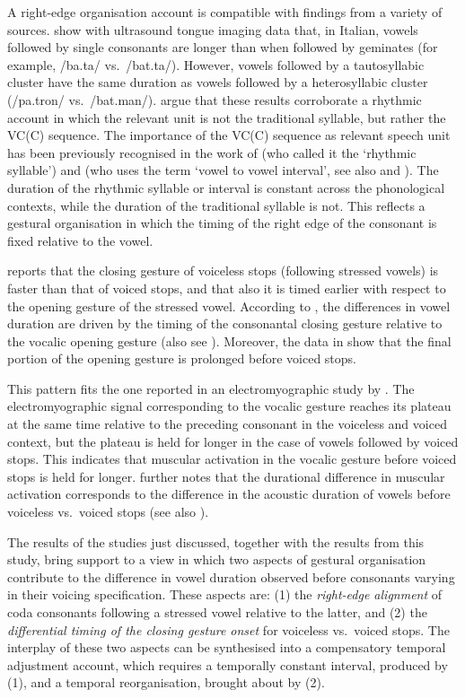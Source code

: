 \documentclass[12pt,]{article}
\begin{document}
A right-edge organisation account is compatible with findings from a
variety of sources. \citet{celata2018} show with ultrasound tongue
imaging data that, in Italian, vowels followed by single consonants are
longer than when followed by geminates (for example, /ba.ta/
vs.~/bat.ta/). However, vowels followed by a tautosyllabic cluster have
the same duration as vowels followed by a heterosyllabic cluster
(/pa.tron/ vs.~/bat.man/). \citet{celata2018} argue that these results
corroborate a rhythmic account in which the relevant unit is not the
traditional syllable, but rather the VC(C) sequence. The importance of
the VC(C) sequence as relevant speech unit has been previously
recognised in the work of \citet{farnetani1986} (who called it the
`rhythmic syllable') and \citet{steriade2012} (who uses the term `vowel
to vowel interval', see also \citealt{hirsch2014} and
\citealt{lunden2017}). The duration of the rhythmic syllable or interval
is constant across the phonological contexts, while the duration of the
traditional syllable is not. This reflects a gestural organisation in
which the timing of the right edge of the consonant is fixed relative to
the vowel.

\citet{de-jong1991} reports that the closing gesture of voiceless stops
(following stressed vowels) is faster than that of voiced stops, and
that also it is timed earlier with respect to the opening gesture of the
stressed vowel. According to \citet{de-jong1991}, the differences in
vowel duration are driven by the timing of the consonantal closing
gesture relative to the vocalic opening gesture (also see
\citealt{hertrich1997}). Moreover, the data in \citet{de-jong1991} show
that the final portion of the opening gesture is prolonged before voiced
stops.

This pattern fits the one reported in an electromyographic study by
\citet{raphael1975}. The electromyographic signal corresponding to the
vocalic gesture reaches its plateau at the same time relative to the
preceding consonant in the voiceless and voiced context, but the plateau
is held for longer in the case of vowels followed by voiced stops. This
indicates that muscular activation in the vocalic gesture before voiced
stops is held for longer. \citet{raphael1975} further notes that the
durational difference in muscular activation corresponds to the
difference in the acoustic duration of vowels before voiceless
vs.~voiced stops (see also \citealt{warren2005}).

The results of the studies just discussed, together with the results
from this study, bring support to a view in which two aspects of
gestural organisation contribute to the difference in vowel duration
observed before consonants varying in their voicing specification. These
aspects are: (1) the \emph{right-edge alignment} of coda consonants
following a stressed vowel relative to the latter, and (2) the
\emph{differential timing of the closing gesture onset} for voiceless
vs.~voiced stops. The interplay of these two aspects can be synthesised
into a compensatory temporal adjustment account, which requires a
temporally constant interval, produced by (1), and a temporal
reorganisation, brought about by (2).
\end{document}
